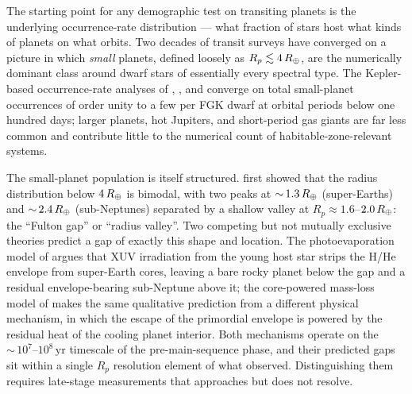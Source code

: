 The starting point for any demographic test on transiting planets is
the underlying occurrence-rate distribution --- what fraction of stars
host what kinds of planets on what orbits.  Two decades of transit
surveys have converged on a picture in which \emph{small} planets,
defined loosely as $R_p \lesssim 4\,R_{\oplus}$, are the numerically
dominant class around dwarf stars of essentially every spectral type.
The Kepler-based occurrence-rate analyses of \textcite{Fressin2013},
\textcite{Kunimoto2020}, and \textcite{Bergsten2022} converge on total
small-planet occurrences of order unity to a few per FGK dwarf at
orbital periods below one hundred days; larger planets, hot Jupiters,
and short-period gas giants are far less common and contribute little
to the numerical count of habitable-zone-relevant systems.

The small-planet population is itself structured.  \textcite{Fulton2017}
first showed that the radius distribution below $4\,R_{\oplus}$ is
bimodal, with two peaks at ${\sim}\,1.3\,R_{\oplus}$ (super-Earths) and
${\sim}\,2.4\,R_{\oplus}$ (sub-Neptunes) separated by a shallow valley
at $R_p \approx 1.6$--$2.0\,R_{\oplus}$: the ``Fulton gap'' or
``radius valley''.  Two competing but not mutually exclusive theories
predict a gap of exactly this shape and location.  The
photoevaporation model of \textcite{OwenWu2017} argues that XUV
irradiation from the young host star strips the H/He envelope from
super-Earth cores, leaving a bare rocky planet below the gap and a
residual envelope-bearing sub-Neptune above it; the core-powered
mass-loss model of \textcite{GinzburgSchlichting2018} makes the same
qualitative prediction from a different physical mechanism, in which
the escape of the primordial envelope is powered by the residual heat
of the cooling planet interior.  Both mechanisms operate on the
${\sim}\,10^{7}$--$10^{8}\,\mathrm{yr}$ timescale of the
pre-main-sequence phase, and their predicted gaps sit within a single
$R_p$ resolution element of what \Kepler observed.  Distinguishing
them requires late-stage measurements that \PLATO approaches but does
not resolve.

